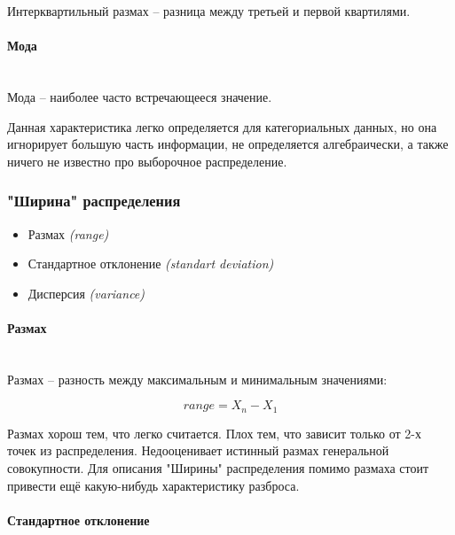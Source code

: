 Интерквартильный размах -- разница между третьей и первой квартилями.

\paragraph{Мода} \mbox{} \\

Мода -- наиболее часто встречающееся значение.

Данная характеристика легко определяется для категориальных данных, но она игнорирует большую часть информации, не определяется алгебраически, а также ничего не известно про выборочное распределение.

\subsubsection{"Ширина" \hspace{0.1cm} распределения}

\begin{itemize}
	\item Размах \textit{(range)}
	\item Стандартное отклонение \textit{(standart deviation)}
	\item Дисперсия \textit{(variance)}
\end{itemize}

\paragraph{Размах} \mbox{} \\

Размах -- разность между максимальным и минимальным значениями:

\begin{equation}
	range = X_n - X_1
\end{equation}

Размах хорош тем, что легко считается. Плох тем, что зависит только от 2-х точек из распределения. Недооценивает истинный размах генеральной совокупности. Для описания "Ширины" распределения помимо размаха стоит привести ещё какую-нибудь характеристику разброса.

\paragraph{Стандартное отклонение} \mbox{} \\

\newpage


